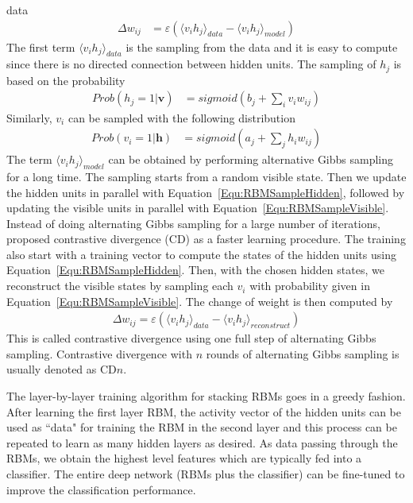 data
\begin{align}
    \Delta w_{ij} &= \varepsilon (\langle v_i h_j \rangle_{data} - \langle v_i h_j \rangle_{model})
\end{align}
The first term $\langle v_i h_j \rangle_{data}$ is the sampling from the data and it is easy to
compute since there is no directed connection between hidden units.
The sampling of $h_j$ is based on the probability
\begin{align}
    Prob(h_j = 1 | \mathbf{v}) &= sigmoid(b_j + \sum_i{v_i w_{ij}})
    \label{Equ:RBMSampleHidden}
\end{align}
Similarly, $v_i$ can be sampled with the following distribution
\begin{align}
    Prob(v_i = 1 | \mathbf{h}) &= sigmoid(a_j + \sum_j{h_i w_{ij}})
    \label{Equ:RBMSampleVisible}
\end{align}
The term $\langle v_i h_j \rangle_{model}$ can be obtained by performing alternative Gibbs
sampling for a long time.
The sampling starts from a random visible state.
Then we update the hidden units in parallel with Equation~\ref{Equ:RBMSampleHidden},
followed by updating the visible units in parallel with Equation~\ref{Equ:RBMSampleVisible}.
Instead of doing alternating Gibbs sampling for a large number of iterations,
\cite{TrainCD} proposed contrastive divergence (CD) as a faster learning procedure.
The training also start with a training vector to compute the states of the hidden units
using Equation~\ref{Equ:RBMSampleHidden}.
Then, with the chosen hidden states, we reconstruct the visible states by sampling each $v_i$
with probability given in Equation~\ref{Equ:RBMSampleVisible}.
The change of weight is then computed by
\begin{align}
    \Delta w_{ij} = \varepsilon (\langle v_i h_j \rangle_{data} -
    \langle v_i h_j \rangle_{reconstruct})
    \label{Equ:RBMCD1}
\end{align}
This is called contrastive divergence using one full step of alternating Gibbs sampling.
Contrastive divergence with $n$ rounds of alternating Gibbs sampling
is usually denoted as CD$n$.

The layer-by-layer training algorithm for stacking RBMs goes in a greedy fashion.
After learning the first layer RBM, the activity vector of the hidden units can be used
as ``data" for training the RBM in the second layer
and this process can be repeated to learn as many hidden layers as desired.
As data passing through the RBMs, we obtain the highest level features 
which are typically fed into a classifier.
The entire deep network (RBMs plus the classifier) can be fine-tuned to
improve the classification performance.


